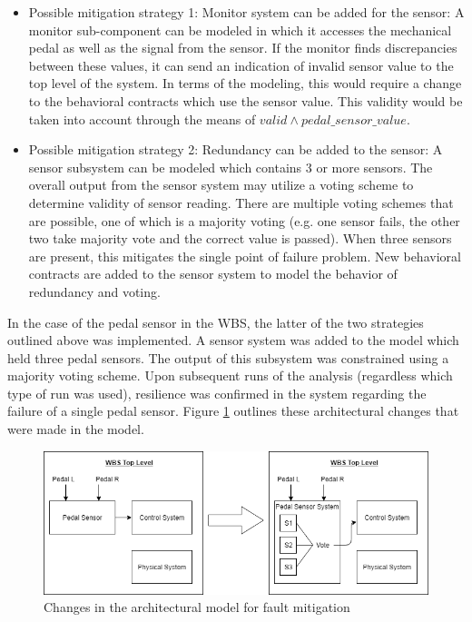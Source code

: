 \begin{itemize}
\item Possible mitigation strategy 1: Monitor system can be added for the sensor: A monitor sub-component can be modeled in which it accesses the mechanical pedal as well as the signal from the sensor. If the monitor finds discrepancies between these values, it can send an indication of invalid sensor value to the top level of the system. In terms of the modeling, this would require a change to the behavioral contracts which use the sensor value. This validity would be taken into account through the means of $valid \land pedal\_sensor\_value$. 

\item Possible mitigation strategy 2: Redundancy can be added to the sensor: A sensor subsystem can be modeled which contains 3 or more sensors. The overall output from the sensor system may utilize a voting scheme to determine validity of sensor reading. There are multiple voting schemes that are possible, one of which is a majority voting (e.g. one sensor fails, the other two take majority vote and the correct value is passed). 
When three sensors are present, this mitigates the single point of failure problem. New behavioral contracts are added to the sensor system to model the behavior of redundancy and voting. 
\end{itemize}

In the case of the pedal sensor in the WBS, the latter of the two strategies outlined above was implemented. A sensor system was added to the model which held three pedal sensors. The output of this subsystem was constrained using a majority voting scheme. Upon subsequent runs of the analysis (regardless which type of run was used), resilience was confirmed in the system regarding the failure of a single pedal sensor. Figure \ref{fig:sensorsystem} outlines these architectural changes that were made in the model.

\begin{figure}[htbp]
	\begin{center}
		\includegraphics[width=\textwidth]{images/sensorsystem.png}
	\end{center}
	\vspace{-0.3in}
	\caption{Changes in the architectural model for fault mitigation}
	\label{fig:sensorsystem}
\end{figure}

